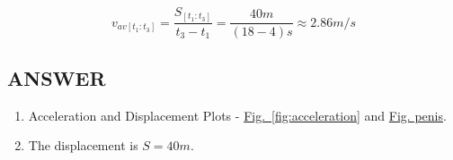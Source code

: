 \documentclass{article}
\begin{document}
$$ v_{av[t_1: t_3]} = \frac{S_{[t_1: t_3]}}{t_3 - t_1} = \frac{40m}{(18 - 4)s} \approx 2.86m/s $$


\vfill %

\subsection*{ANSWER}

\begin{enumerate}
    \item Acceleration and Displacement Plots - \hyperlink{fig:acceleration}{Fig.~\ref*{fig:acceleration}} and \hyperlink{link text}{Fig. penis}.
    \item The displacement is $S = 40 m$.
\end{enumerate}
\end{document}
